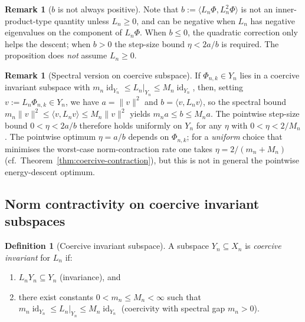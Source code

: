 \documentclass[11pt, a4paper]{amsart}
\theoremstyle{definition}
\newtheorem{definition}[theorem]{Definition}
\newtheorem{remark}[theorem]{Remark}
\newcommand{\id}{\operatorname{id}}
\begin{document}
\begin{remark}[$b$ is not always positive]
\label{rmk:b-sign}
Note that $b := \langle L_n \Phi, L_n^2 \Phi \rangle$ is not an
inner-product-type quantity unless $L_n \geq 0$, and can be
negative when $L_n$ has negative eigenvalues on the component of
$L_n \Phi$. When $b \leq 0$, the quadratic correction only helps
the descent; when $b > 0$ the step-size bound $\eta < 2a/b$ is
required. The proposition does \emph{not} assume $L_n \geq 0$.
\end{remark}

\begin{remark}[Spectral version on coercive subspace]
\label{rmk:spectral-version-descent}
If $\Phi_{n, k} \in Y_n$ lies in a coercive invariant subspace with
$m_n \id_{Y_n} \leq L_n|_{Y_n} \leq M_n \id_{Y_n}$, then, setting
$v := L_n \Phi_{n,k} \in Y_n$, we have $a = \|v\|^2$ and
$b = \langle v, L_n v \rangle$, so the spectral bound
$m_n \|v\|^2 \leq \langle v, L_n v \rangle \leq M_n \|v\|^2$ yields
$m_n a \leq b \leq M_n a$. The pointwise step-size bound $0 < \eta
< 2a/b$ therefore holds uniformly on $Y_n$ for any $\eta$ with $0 <
\eta < 2/M_n$. The pointwise optimum $\eta = a/b$ depends on
$\Phi_{n,k}$; for a \emph{uniform} choice that minimises the
worst-case norm-contraction rate one takes $\eta = 2/(m_n + M_n)$
(cf.\ Theorem~\ref{thm:coercive-contraction}), but this is not in
general the pointwise energy-descent optimum.
\end{remark}

\subsection{Norm contractivity on coercive invariant subspaces}

\begin{definition}[Coercive invariant subspace]
\label{def:coercive}
A subspace $Y_n \subseteq X_n$ is \emph{coercive invariant} for
$L_n$ if:
\begin{enumerate}
\item $L_n Y_n \subseteq Y_n$ (invariance), and
\item there exist constants $0 < m_n \leq M_n < \infty$ such that
  $m_n \id_{Y_n} \leq L_n|_{Y_n} \leq M_n \id_{Y_n}$
  (coercivity with spectral gap $m_n > 0$).
\end{enumerate}
\end{definition}
\end{document}
